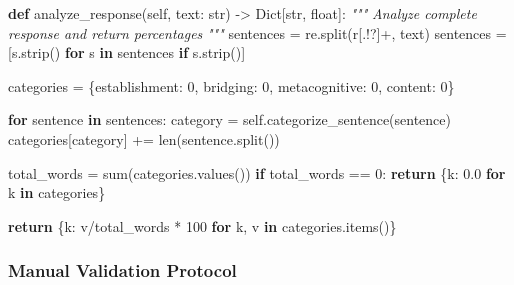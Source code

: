 \documentclass[
  11pt]{article}
\newenvironment{Shaded}{}{}
\newcommand{\BuiltInTok}[1]{\textcolor[rgb]{0.00,0.50,0.00}{#1}}
\newcommand{\CommentTok}[1]{\textcolor[rgb]{0.38,0.63,0.69}{\textit{#1}}}
\newcommand{\ControlFlowTok}[1]{\textcolor[rgb]{0.00,0.44,0.13}{\textbf{#1}}}
\newcommand{\DecValTok}[1]{\textcolor[rgb]{0.25,0.63,0.44}{#1}}
\newcommand{\FloatTok}[1]{\textcolor[rgb]{0.25,0.63,0.44}{#1}}
\newcommand{\KeywordTok}[1]{\textcolor[rgb]{0.00,0.44,0.13}{\textbf{#1}}}
\newcommand{\NormalTok}[1]{#1}
\newcommand{\OperatorTok}[1]{\textcolor[rgb]{0.40,0.40,0.40}{#1}}
\newcommand{\PreprocessorTok}[1]{\textcolor[rgb]{0.74,0.48,0.00}{#1}}
\newcommand{\StringTok}[1]{\textcolor[rgb]{0.25,0.44,0.63}{#1}}
\newcommand{\VariableTok}[1]{\textcolor[rgb]{0.10,0.09,0.49}{#1}}
\newcommand{\VerbatimStringTok}[1]{\textcolor[rgb]{0.25,0.44,0.63}{#1}}
\begin{document}
\begin{Shaded}
\begin{Highlighting}[]
    \KeywordTok{def}\NormalTok{ analyze\_response(}\VariableTok{self}\NormalTok{, text: }\BuiltInTok{str}\NormalTok{) }\OperatorTok{{-}\textgreater{}}\NormalTok{ Dict[}\BuiltInTok{str}\NormalTok{, }\BuiltInTok{float}\NormalTok{]:}
        \CommentTok{"""}
\CommentTok{        Analyze complete response and return percentages}
\CommentTok{        """}
\NormalTok{        sentences }\OperatorTok{=}\NormalTok{ re.split(}\VerbatimStringTok{r\textquotesingle{}}\PreprocessorTok{[.!?]}\OperatorTok{+}\VerbatimStringTok{\textquotesingle{}}\NormalTok{, text)}
\NormalTok{        sentences }\OperatorTok{=}\NormalTok{ [s.strip() }\ControlFlowTok{for}\NormalTok{ s }\KeywordTok{in}\NormalTok{ sentences }\ControlFlowTok{if}\NormalTok{ s.strip()]}
        
\NormalTok{        categories }\OperatorTok{=}\NormalTok{ \{}\StringTok{\textquotesingle{}establishment\textquotesingle{}}\NormalTok{: }\DecValTok{0}\NormalTok{, }\StringTok{\textquotesingle{}bridging\textquotesingle{}}\NormalTok{: }\DecValTok{0}\NormalTok{, }
                     \StringTok{\textquotesingle{}metacognitive\textquotesingle{}}\NormalTok{: }\DecValTok{0}\NormalTok{, }\StringTok{\textquotesingle{}content\textquotesingle{}}\NormalTok{: }\DecValTok{0}\NormalTok{\}}
        
        \ControlFlowTok{for}\NormalTok{ sentence }\KeywordTok{in}\NormalTok{ sentences:}
\NormalTok{            category }\OperatorTok{=} \VariableTok{self}\NormalTok{.categorize\_sentence(sentence)}
\NormalTok{            categories[category] }\OperatorTok{+=} \BuiltInTok{len}\NormalTok{(sentence.split())}
        
\NormalTok{        total\_words }\OperatorTok{=} \BuiltInTok{sum}\NormalTok{(categories.values())}
        \ControlFlowTok{if}\NormalTok{ total\_words }\OperatorTok{==} \DecValTok{0}\NormalTok{:}
            \ControlFlowTok{return}\NormalTok{ \{k: }\FloatTok{0.0} \ControlFlowTok{for}\NormalTok{ k }\KeywordTok{in}\NormalTok{ categories\}}
        
        \ControlFlowTok{return}\NormalTok{ \{k: v}\OperatorTok{/}\NormalTok{total\_words }\OperatorTok{*} \DecValTok{100} \ControlFlowTok{for}\NormalTok{ k, v }\KeywordTok{in}\NormalTok{ categories.items()\}}
\end{Highlighting}
\end{Shaded}

\subsubsection{Manual Validation
Protocol}\label{manual-validation-protocol}
\end{document}
